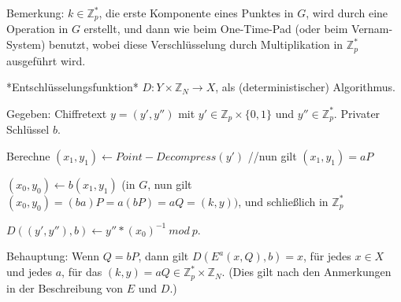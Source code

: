 \documentclass[a4paper]{article}
\begin{document}
\begin{multicols}{3}
    Bemerkung: $k\in\mathbb{Z}^*_p$, die erste Komponente eines Punktes in $G$, wird durch eine Operation in $G$ erstellt, und dann wie beim One-Time-Pad (oder beim Vernam-System) benutzt, wobei diese Verschlüsselung durch Multiplikation in $\mathbb{Z}^*_p$ ausgeführt wird.

    *Entschlüsselungsfunktion* $D:Y\times\mathbb{Z}_N \rightarrow X$, als (deterministischer) Algorithmus.
    \begin{itemize*}
        \item Gegeben: Chiffretext $y=(y',y'')$ mit $y'\in\mathbb{Z}_p\times\{0,1\}$ und $y''\in\mathbb{Z}^*_p$. Privater Schlüssel $b$.
        \item Berechne $(x_1,y_1)\leftarrow Point-Decompress (y')$ //nun gilt $(x_1,y_1) =aP$
        \item $(x_0,y_0)\leftarrow b(x_1,y_1)$ (in $G$, nun gilt $(x_0,y_0) = (ba)P=a(bP) =aQ= (k,y))$, und schließlich in $\mathbb{Z}^*_p$
        \item $D((y',y''),b)\leftarrow y''*(x_0)^{-1}\ mod\ p$.
    \end{itemize*}

    Behauptung: Wenn $Q=bP$, dann gilt $D(E^a (x,Q),b) =x$, für jedes $x\in X$ und jedes $a$, für das $(k,y) =aQ\in\mathbb{Z}^*_p \times\mathbb{Z}_N$. (Dies gilt nach den Anmerkungen in der Beschreibung von $E$ und $D$.)

\end{multicols}
\end{document}
